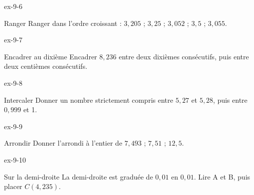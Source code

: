 \begin{blocLivre}{ex-9-6}\begin{exercice}[2]{Ranger}
Ranger dans l’ordre croissant : $3{,}205$ ; $3{,}25$ ; $3{,}052$ ; $3{,}5$ ; $3{,}055$.
\end{exercice}\end{blocLivre}
\begin{blocLivre}{ex-9-7}\begin{exercice}[2]{Encadrer au dixième}
Encadrer $8{,}236$ entre deux dixièmes consécutifs, puis entre deux centièmes consécutifs.
\end{exercice}\end{blocLivre}
\begin{blocLivre}{ex-9-8}\begin{exercice}[2]{Intercaler}
Donner un nombre strictement compris entre $5{,}27$ et $5{,}28$, puis entre $0{,}999$ et 1.
\end{exercice}\end{blocLivre}
\begin{blocLivre}{ex-9-9}\begin{exercice}[2]{Arrondir}
Donner l’arrondi à l’entier de $7{,}493$ ; $7{,}51$ ; $12{,}5$.
\end{exercice}\end{blocLivre}
\begin{blocLivre}{ex-9-10}\begin{exercice}[2]{Sur la demi-droite}
La demi-droite est graduée de $0{,}01$ en $0{,}01$. Lire A et B, puis placer $C(4{,}235)$.
\label{fig-ex-9-10}
\end{exercice}\end{blocLivre}

